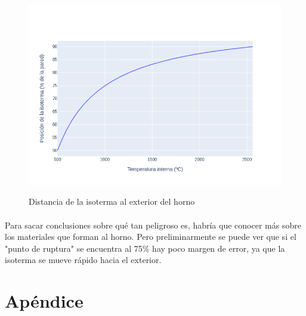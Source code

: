 \documentclass[12pt]{article}
\begin{document}
\begin{figure}[H]
\caption{Distancia de la isoterma al exterior del horno}
\centering
\includegraphics[width=\textwidth]{peligrosidad.distance}
\label{fig:peligrosidad.distance}
\end{figure}

\paragraph{} Para sacar conclusiones sobre qué tan peligroso es, habría que conocer más sobre los materiales que forman al horno. Pero preliminarmente se puede ver que si el "punto de ruptura" se encuentra al 75\% hay poco margen de error, ya que la isoterma se mueve rápido hacia el exterior.

\section{Apéndice}

\tableofcontents

\listoffigures
\end{document}
